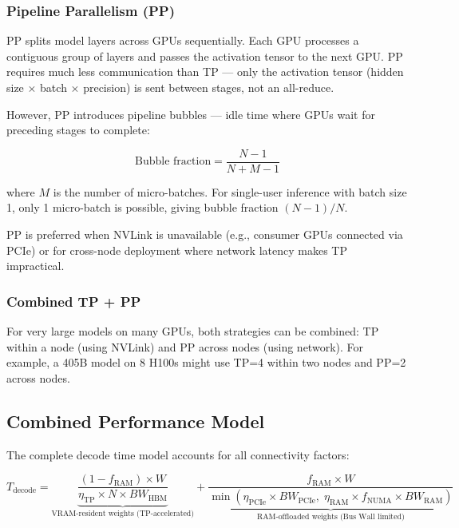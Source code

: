 \documentclass[11pt,a4paper]{article}
\theoremstyle{definition}
\begin{document}
\subsubsection{Pipeline Parallelism (PP)}

PP splits model layers across GPUs sequentially. Each GPU processes a contiguous group of layers and passes the activation tensor to the next GPU. PP requires much less communication than TP --- only the activation tensor (hidden size $\times$ batch $\times$ precision) is sent between stages, not an all-reduce.

However, PP introduces pipeline bubbles --- idle time where GPUs wait for preceding stages to complete:

\begin{equation}\label{eq:pp_bubble}
\text{Bubble fraction} = \frac{N-1}{N + M - 1}
\end{equation}

where $M$ is the number of micro-batches. For single-user inference with batch size 1, only 1 micro-batch is possible, giving bubble fraction $(N-1)/N$.

PP is preferred when NVLink is unavailable (e.g., consumer GPUs connected via PCIe) or for cross-node deployment where network latency makes TP impractical.

\subsubsection{Combined TP + PP}

For very large models on many GPUs, both strategies can be combined: TP within a node (using NVLink) and PP across nodes (using network). For example, a 405B model on 8 H100s might use TP=4 within two nodes and PP=2 across nodes.

\subsection{Combined Performance Model}

The complete decode time model accounts for all connectivity factors:

\begin{equation}\label{eq:combined_decode}
T_{\text{decode}} = \underbrace{\frac{(1-f_{\text{RAM}}) \times W}{\eta_{\text{TP}} \times N \times BW_{\text{HBM}}}}_{\text{VRAM-resident weights (TP-accelerated)}} + \underbrace{\frac{f_{\text{RAM}} \times W}{\min(\eta_{\text{PCIe}} \times BW_{\text{PCIe}}, \; \eta_{\text{RAM}} \times f_{\text{NUMA}} \times BW_{\text{RAM}})}}_{\text{RAM-offloaded weights (Bus Wall limited)}}
\end{equation}
\end{document}
